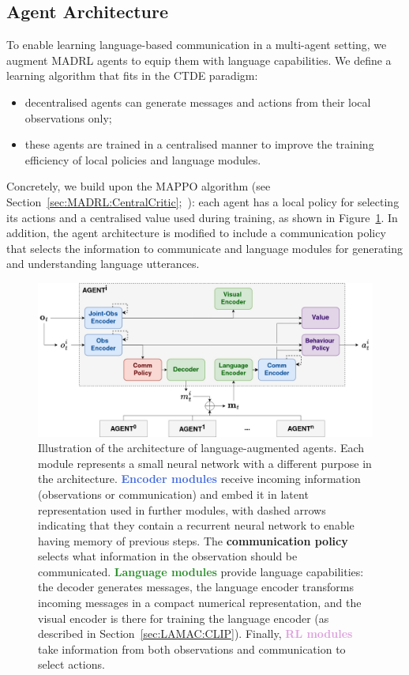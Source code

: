 \subsection{Agent Architecture}\label{sec:LAMAC:Archi}

To enable learning language-based communication in a multi-agent setting, we augment MADRL agents to equip them with language capabilities. We define a learning algorithm that fits in the CTDE paradigm: 
\begin{itemize}
    \item decentralised agents can generate messages and actions from their local observations only;
    \item these agents are trained in a centralised manner to improve the training efficiency of local policies and language modules.
\end{itemize}
Concretely, we build upon the MAPPO algorithm (see Section~\ref{sec:MADRL:CentralCritic};~\cite{Yu2021_MAPPO}): each agent has a local policy for selecting its actions and a centralised value used during training, as shown in Figure~\ref{fig:LAMAC:archi}. 
In addition, the agent architecture is modified to include a communication policy that selects the information to communicate and language modules for generating and understanding language utterances. 

\begin{figure}
    \centering
    \includegraphics[width=0.95\linewidth]{Figures/LAMAC/archi.jpg}
    \caption{Illustration of the architecture of language-augmented agents. Each module represents a small neural network with a different purpose in the architecture. \textcolor{RoyalBlue}{\textbf{Encoder modules}} receive incoming information (observations or communication) and embed it in latent representation used in further modules, with dashed arrows indicating that they contain a recurrent neural network to enable having memory of previous steps. The \textcolor{BrickRed}{\textbf{communication policy}} selects what information in the observation should be communicated. \textcolor{ForestGreen}{\textbf{Language modules}} provide language capabilities: the decoder generates messages, the language encoder transforms incoming messages in a compact numerical representation, and the visual encoder is there for training the language encoder (as described in Section~\ref{sec:LAMAC:CLIP}). Finally, \textcolor{Plum}{\textbf{RL modules}} take information from both observations and communication to select actions.}
    \label{fig:LAMAC:archi}
\end{figure}

